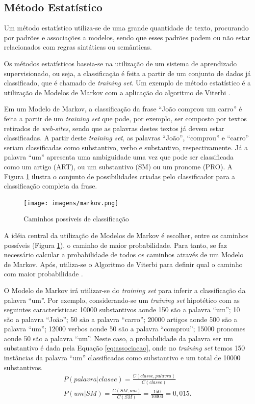 \subsection{Método Estatístico}
Um método estatístico utiliza-se de uma grande
quantidade de texto, procurando por padrões e
associações a modelos, sendo que esses padrões podem ou não estar relacionados
com regras sintáticas ou semânticas.

Os métodos estatísticos baseia-se na utilização de um sistema de aprendizado
supervisionado, ou seja, a classificação é feita a partir de um conjunto de dados já
classificado, que é chamado de \textit{training set}. Um exemplo de método
estatístico é a utilização de Modelos de Markov com a aplicação do algoritmo de
Viterbi \cite{manningschutze1999}.

Em um Modelo de Markov, a classificação da frase ``João comprou um
carro'' é feita a partir de um \textit{training set} que pode, por exemplo, ser
composto por textos retirados de \textit{web-sites}, sendo que as palavras
destes textos já devem estar classificadas. A partir deste \textit{training
set}, as palavras ``João'', ``comprou'' e ``carro'' seriam classificadas como
substantivo, verbo e substantivo, respectivamente. Já a palavra ``um'' apresenta uma ambiguidade uma vez que pode
ser classificada como um artigo (ART), ou um substantivo (SM) ou um pronome
(PRO).
A Figura \ref{fig:markov} ilustra o conjunto de possibilidades criadas pelo
classificador para a classificação completa da frase.

\begin{figure}[htbp]
\centering
\texttt{[image: imagens/markov.png]}
\caption{Caminhos possíveis de classificação}
\label{fig:markov}
\end{figure}

A idéia central da utilização de Modelos de Markov é
escolher, entre os caminhos possíveis (Figura \ref{fig:markov}), o caminho
de maior probabilidade. Para tanto, se faz necessário calcular a probabilidade de todos
os caminhos através de um Modelo de Markov. Após, utiliza-se o
Algoritmo de Viterbi para definir qual o caminho com maior probabilidade
\cite{manningschutze1999}.

O Modelo de Markov irá utilizar-se do \textit{training set} para inferir a
classificação da palavra ``um''. Por exemplo, considerando-se um
\textit{training set} hipotético com as seguintes características: 10000
substantivos aonde 150 são a palavra ``um''; 10
são a palavra ``João''; 50 são a palavra ``carro''; 20000 artigos aonde 500 são
a palavra ``um''; 12000 verbos aonde 50 são a palavra ``comprou''; 15000
pronomes aonde 50 são a palavra ``um''. Neste caso, a probabilidade da palavra
ser um substantivo é dada pela Equação \ref{eq:associacao}, onde no
\textit{training set} temos 150 instâncias da palavra ``um'' classificadas como
substantivo e um total de 10000 substantivos.
\begin{equation}
\begin{split}
P(palavra|classe) = \frac{C(classe,palavra)}{C(classe)}  \\
P(um|SM) = \frac{C(SM,um)}{C(SM)} = \frac{150}{10000} = 0,015.
\end{split}
\label{eq:associacao}
\end{equation}

